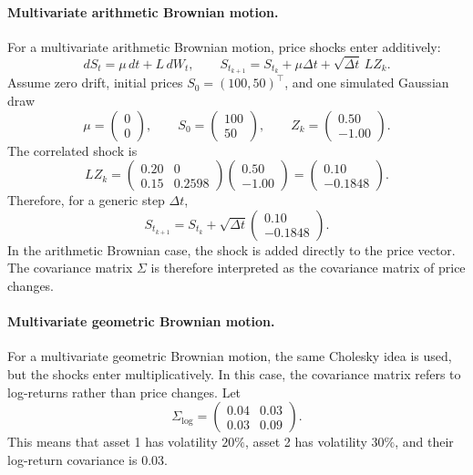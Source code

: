 \paragraph{Multivariate arithmetic Brownian motion.}
For a multivariate arithmetic Brownian motion, price shocks enter additively:
\[
dS_t=\mu\,dt+L\,dW_t,
\qquad
S_{t_{k+1}}=S_{t_k}+\mu\Delta t+\sqrt{\Delta t}\,LZ_k.
\]
Assume zero drift, initial prices $S_0=(100,50)^\top$, and one simulated Gaussian draw
\[
\mu=
\begin{pmatrix}
0\\
0
\end{pmatrix},
\qquad
S_0=
\begin{pmatrix}
100\\
50
\end{pmatrix},
\qquad
Z_k=
\begin{pmatrix}
0.50\\
-1.00
\end{pmatrix}.
\]
The correlated shock is
\[
LZ_k
=
\begin{pmatrix}
0.20 & 0\\
0.15 & 0.2598
\end{pmatrix}
\begin{pmatrix}
0.50\\
-1.00
\end{pmatrix}
=
\begin{pmatrix}
0.10\\
-0.1848
\end{pmatrix}.
\]
Therefore, for a generic step $\Delta t$,
\[
S_{t_{k+1}}
=
S_{t_k}
+
\sqrt{\Delta t}
\begin{pmatrix}
0.10\\
-0.1848
\end{pmatrix}.
\]
In the arithmetic Brownian case, the shock is added directly to the price vector. The covariance matrix $\Sigma$ is therefore interpreted as the covariance matrix of price changes.

\paragraph{Multivariate geometric Brownian motion.}
For a multivariate geometric Brownian motion, the same Cholesky idea is used, but the shocks enter multiplicatively. In this case, the covariance matrix refers to log-returns rather than price changes. Let
\[
\Sigma_{\log}
=
\begin{pmatrix}
0.04 & 0.03\\
0.03 & 0.09
\end{pmatrix}.
\]
This means that asset 1 has volatility $20\%$, asset 2 has volatility $30\%$, and their log-return covariance is $0.03$.

